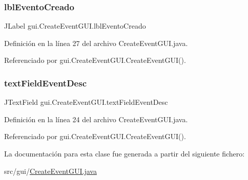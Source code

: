 \subsubsection{\texorpdfstring{lblEventoCreado}{lblEventoCreado}}
{\footnotesize\ttfamily J\+Label gui.\+Create\+Event\+G\+U\+I.\+lbl\+Evento\+Creado\hspace{0.3cm}{\ttfamily [private]}}



Definición en la línea 27 del archivo Create\+Event\+G\+U\+I.\+java.



Referenciado por gui.\+Create\+Event\+G\+U\+I.\+Create\+Event\+G\+U\+I().

\mbox{\label{classgui_1_1CreateEventGUI_a7500da1a45bd490e612ff33bfb91592b}} 
\subsubsection{\texorpdfstring{textFieldEventDesc}{textFieldEventDesc}}
{\footnotesize\ttfamily J\+Text\+Field gui.\+Create\+Event\+G\+U\+I.\+text\+Field\+Event\+Desc\hspace{0.3cm}{\ttfamily [private]}}



Definición en la línea 24 del archivo Create\+Event\+G\+U\+I.\+java.



Referenciado por gui.\+Create\+Event\+G\+U\+I.\+Create\+Event\+G\+U\+I().



La documentación para esta clase fue generada a partir del siguiente fichero\+:\begin{DoxyCompactItemize}
\item 
src/gui/\mbox{\hyperlink{CreateEventGUI_8java}{Create\+Event\+G\+U\+I.\+java}}\end{DoxyCompactItemize}
